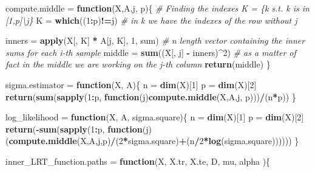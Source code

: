 \documentclass[
]{article}
\newenvironment{Shaded}{\begin{snugshade}}{\end{snugshade}}
\newcommand{\CommentTok}[1]{\textcolor[rgb]{0.56,0.35,0.01}{\textit{#1}}}
\newcommand{\ControlFlowTok}[1]{\textcolor[rgb]{0.13,0.29,0.53}{\textbf{#1}}}
\newcommand{\DecValTok}[1]{\textcolor[rgb]{0.00,0.00,0.81}{#1}}
\newcommand{\KeywordTok}[1]{\textcolor[rgb]{0.13,0.29,0.53}{\textbf{#1}}}
\newcommand{\NormalTok}[1]{#1}
\newcommand{\OperatorTok}[1]{\textcolor[rgb]{0.81,0.36,0.00}{\textbf{#1}}}
\newcommand{\StringTok}[1]{\textcolor[rgb]{0.31,0.60,0.02}{#1}}
\begin{document}
\begin{Shaded}
\begin{Highlighting}[]
\NormalTok{compute.middle =}\StringTok{ }\ControlFlowTok{function}\NormalTok{(X,A,j, p)\{}
  \CommentTok{# Finding the indexes K = \{k s.t. k is in [1,p]\textbackslash{}j\}}
\NormalTok{  K =}\StringTok{ }\KeywordTok{which}\NormalTok{((}\DecValTok{1}\OperatorTok{:}\NormalTok{p)}\OperatorTok{!=}\NormalTok{j)}
  \CommentTok{# in k we have the indexes of the row without j}
  
\NormalTok{  inners =}\StringTok{ }\KeywordTok{apply}\NormalTok{(X[, K] }\OperatorTok{*}\StringTok{ }\NormalTok{A[j, K], }\DecValTok{1}\NormalTok{, sum) }\CommentTok{# n length vector containing the inner sums for each i-th sample}
\NormalTok{  middle =}\StringTok{ }\KeywordTok{sum}\NormalTok{((X[, j] }\OperatorTok{-}\StringTok{ }\NormalTok{inners)}\OperatorTok{^}\DecValTok{2}\NormalTok{)  }\CommentTok{# as a matter of fact in the middle we are working on the j-th column}
  \KeywordTok{return}\NormalTok{(middle)}
\NormalTok{\}}

\NormalTok{sigma.estimator =}\StringTok{ }\ControlFlowTok{function}\NormalTok{(X, A)\{}
\NormalTok{  n =}\StringTok{ }\KeywordTok{dim}\NormalTok{(X)[}\DecValTok{1}\NormalTok{]}
\NormalTok{  p =}\StringTok{ }\KeywordTok{dim}\NormalTok{(X)[}\DecValTok{2}\NormalTok{]}
  \KeywordTok{return}\NormalTok{(}\KeywordTok{sum}\NormalTok{(}\KeywordTok{sapply}\NormalTok{(}\DecValTok{1}\OperatorTok{:}\NormalTok{p, }\ControlFlowTok{function}\NormalTok{(j)}\KeywordTok{compute.middle}\NormalTok{(X,A,j, p)))}\OperatorTok{/}\NormalTok{(n}\OperatorTok{*}\NormalTok{p))}
\NormalTok{\}}

\NormalTok{log_likelihood =}\StringTok{ }\ControlFlowTok{function}\NormalTok{(X, A, sigma.square)\{}
\NormalTok{  n =}\StringTok{ }\KeywordTok{dim}\NormalTok{(X)[}\DecValTok{1}\NormalTok{]}
\NormalTok{  p =}\StringTok{ }\KeywordTok{dim}\NormalTok{(X)[}\DecValTok{2}\NormalTok{]}
  \KeywordTok{return}\NormalTok{(}\OperatorTok{-}\KeywordTok{sum}\NormalTok{(}\KeywordTok{sapply}\NormalTok{(}\DecValTok{1}\OperatorTok{:}\NormalTok{p, }\ControlFlowTok{function}\NormalTok{(j) (}\KeywordTok{compute.middle}\NormalTok{(X,A,j,p)}\OperatorTok{/}\NormalTok{(}\DecValTok{2}\OperatorTok{*}\NormalTok{sigma.square)}\OperatorTok{+}\NormalTok{(n}\OperatorTok{/}\DecValTok{2}\OperatorTok{*}\KeywordTok{log}\NormalTok{(sigma.square))))))}
\NormalTok{\}}


\NormalTok{inner_LRT_function.paths =}\StringTok{ }\ControlFlowTok{function}\NormalTok{(X, X.tr, X.te, D, mu, alpha )\{}
  

\end{Highlighting}
\end{Shaded}
\end{document}
